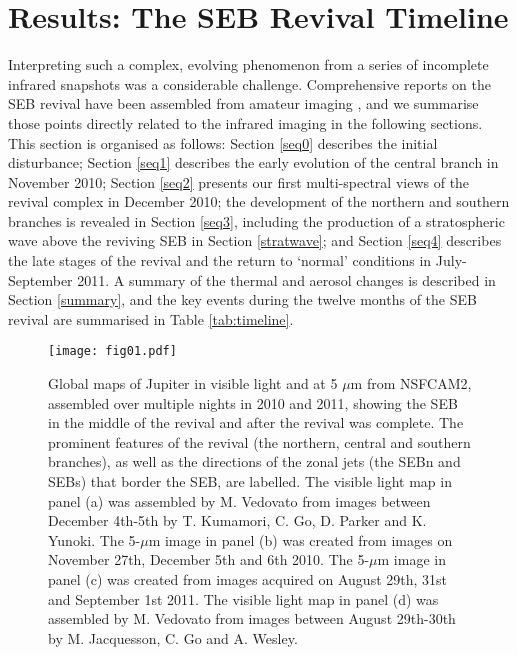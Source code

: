 \documentclass[final,authoryear,5p,times,twocolumn]{elsarticle}
\begin{document}
\section{Results:  The SEB Revival Timeline}
\label{timeline}

Interpreting such a complex, evolving phenomenon from a series of incomplete infrared snapshots was a considerable challenge.  Comprehensive reports on the SEB revival have been assembled from amateur imaging \citep[e.g.,][]{11rogers_21, 11rogers_24, 15rogers, 16rogers}, and we summarise those points directly related to the infrared imaging in the following sections. This section is organised as follows:  Section \ref{seq0} describes the initial disturbance; Section \ref{seq1} describes the early evolution of the central branch in November 2010; Section \ref{seq2} presents our first multi-spectral views of the revival complex in December 2010; the development of the northern and southern branches is revealed in Section \ref{seq3}, including the production of a stratospheric wave above the reviving SEB in Section \ref{stratwave}; and Section \ref{seq4} describes the late stages of the revival and the return to `normal' conditions in July-September 2011.  A summary of the thermal and aerosol changes is described in Section \ref{summary}, and the key events during the twelve months of the SEB revival are summarised in Table \ref{tab:timeline}.

\begin{figure*}
\begin{centering}
\centerline{\texttt{[image: fig01.pdf]}}
\caption{Global maps of Jupiter in visible light and at 5 $\mu$m from NSFCAM2, assembled over multiple nights in 2010 and 2011, showing the SEB in the middle of the revival and after the revival was complete.  The prominent features of the revival (the northern, central and southern branches), as well as the directions of the zonal jets (the SEBn and SEBs) that border the SEB, are labelled.  The visible light map in panel (a) was assembled by M. Vedovato from images between December 4th-5th by T. Kumamori, C. Go, D. Parker and K. Yunoki. The 5-$\mu$m image in panel (b) was created from images on November 27th, December 5th and 6th 2010.  The 5-$\mu$m image in panel (c) was created from images acquired on August 29th, 31st and September 1st 2011.  The visible light map in panel (d) was assembled by M. Vedovato from images between August 29th-30th by M. Jacquesson, C. Go and A. Wesley. }
\label{5um_maps}
\end{centering}
\end{figure*}
\end{document}
